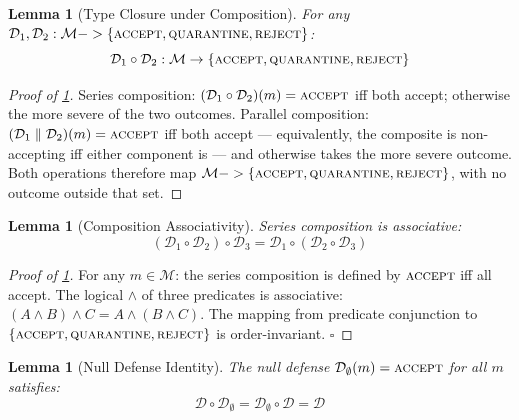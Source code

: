 \documentclass[
]{article}
\newtheorem{lemma}[theorem]{Lemma}
\begin{document}
\begin{lemma}[Type Closure under Composition]
\label{lem:type-closure}
For any $\mathcal{D}_1, \mathcal{D}_2: \mathcal{M} -> \{\textsc{accept}, \textsc{quarantine}, \textsc{reject}\}$:
\begin{equation}
\label{eq:type-closure}
\mathcal{D}_1 \circ \mathcal{D}_2: \mathcal{M} \to \{\textsc{accept}, \textsc{quarantine}, \textsc{reject}\}
\end{equation}
\end{lemma}

\begin{proof}[Proof of \cref{lem:type-closure}]
Series composition: $(\mathcal{D}_1 \circ \mathcal{D}_2)(m) = \textsc{accept}$ iff both accept; otherwise the more severe of the two outcomes. Parallel composition: $(\mathcal{D}_1 \parallel \mathcal{D}_2)(m) = \textsc{accept}$ iff both accept --- equivalently, the composite is non-accepting iff either component is --- and otherwise takes the more severe outcome. Both operations therefore map $\mathcal{M} -> \{\textsc{accept}, \textsc{quarantine}, \textsc{reject}\}$, with no outcome outside that set.
\end{proof}

\begin{lemma}[Composition Associativity]
\label{lem:comp-assoc}
Series composition is associative:
\begin{equation}
\label{eq:comp-assoc}
(\mathcal{D}_1 \circ \mathcal{D}_2) \circ \mathcal{D}_3 = \mathcal{D}_1 \circ (\mathcal{D}_2 \circ \mathcal{D}_3)
\end{equation}
\end{lemma}

\begin{proof}[Proof of \cref{lem:comp-assoc}]
For any $m \in \mathcal{M}$: the series composition is defined by $\textsc{accept}$ iff all accept. The logical $\land$ of three predicates is associative: $(A \land B) \land C = A \land (B \land C)$. The mapping from predicate conjunction to $\{\textsc{accept}, \textsc{quarantine}, \textsc{reject}\}$ is order-invariant. $\square$
\end{proof}

\begin{lemma}[Null Defense Identity]
\label{lem:null-identity}
The null defense $\mathcal{D}_\emptyset(m) = \textsc{accept}$ for all $m$ satisfies:
\begin{equation}
\label{eq:null-identity}
\mathcal{D} \circ \mathcal{D}_\emptyset = \mathcal{D}_\emptyset \circ \mathcal{D} = \mathcal{D}
\end{equation}
\end{lemma}
\end{document}
